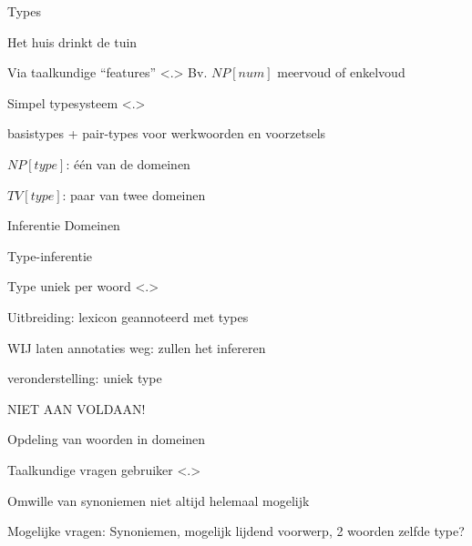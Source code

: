 \documentclass[notes, dvipsnames]{beamer}
\newcommand{\seperation}{
	\vspace{1em}
	\ppause
}
\newcommand{\hitem}{
	\ppause
	\item
}
\newcommand{\ppause}{\onslide<+>}
\newcommand{\nnote}[1]{\note<.>{#1}}
\begin{document}
	\begin{frame}{Types}
    \begin{itemize}
      \hitem Het huis drinkt de tuin

      \seperation
      \item Via taalkundige ``features''
      \nnote{
        Bv. $NP[num]$ meervoud of enkelvoud
      }

      \seperation
      \item Simpel typesysteem
      \nnote{
        \item basistypes + pair-types voor werkwoorden en voorzetsels
        \item $NP[type]$: één van de domeinen
        \item $TV[type]$: paar van twee domeinen
      }
    \end{itemize}
	\end{frame}

  \begin{frame}{Inferentie Domeinen}
    \begin{itemize}
      \hitem Type-inferentie
      \item Type uniek per woord
      \nnote{
        Uitbreiding: lexicon geannoteerd met types
        \item WIJ laten annotaties weg: zullen het infereren
        \item veronderstelling: uniek type
        \item NIET AAN VOLDAAN!
        \item Opdeling van woorden in domeinen
      }
      \hitem Taalkundige vragen gebruiker
      \nnote{
        \item Omwille van synoniemen niet altijd helemaal mogelijk
        \item Mogelijke vragen: Synoniemen, mogelijk lijdend voorwerp, 2 woorden zelfde type?
      }
    \end{itemize}
  \end{frame}
\end{document}
